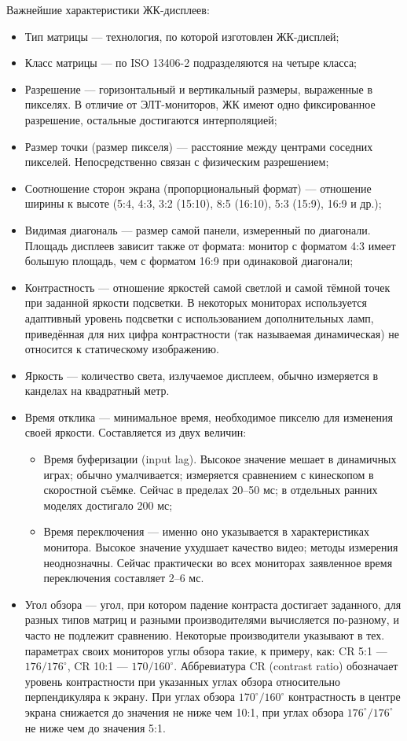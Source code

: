Важнейшие характеристики ЖК-дисплеев:
\begin{itemize}
\item Тип матрицы --- технология, по которой изготовлен ЖК-дисплей;
 \item Класс матрицы --- по ISO 13406-2 подразделяются на четыре класса;
 \item Разрешение --- горизонтальный и вертикальный размеры, выраженные в пикселях.
  В отличие от ЭЛТ-мониторов, ЖК имеют одно фиксированное разрешение, остальные достигаются интерполяцией;
 \item Размер точки (размер пикселя) --- расстояние между центрами соседних пикселей.
  Непосредственно связан с физическим разрешением;
 \item Соотношение сторон экрана (пропорциональный формат) --- отношение ширины к высоте (5:4, 4:3, 3:2 (15:10), 8:5 (16:10), 5:3 (15:9), 16:9 и др.);
 \item Видимая диагональ --- размер самой панели, измеренный по диагонали.
  Площадь дисплеев зависит также от формата: монитор с форматом 4:3 имеет большую площадь, чем с форматом 16:9 при одинаковой диагонали;
 \item Контрастность --- отношение яркостей самой светлой и самой тёмной точек при заданной яркости подсветки.
  В некоторых мониторах используется адаптивный уровень подсветки с использованием дополнительных ламп, приведённая для них цифра контрастности (так называемая динамическая) не относится к статическому изображению.
 \item Яркость --- количество света, излучаемое дисплеем, обычно измеряется в канделах на квадратный метр.
 \item Время отклика --- минимальное время, необходимое пикселю для изменения своей яркости.
  Составляется из двух величин: 
  \begin{itemize} 
   \item Время буферизации (input lag).
    Высокое значение мешает в динамичных играх; обычно умалчивается; измеряется сравнением с кинескопом в скоростной съёмке.
    Сейчас в пределах 20--50 мс; в отдельных ранних моделях достигало 200 мс;
   \item Время переключения --- именно оно указывается в характеристиках монитора.
    Высокое значение ухудшает качество видео; методы измерения неоднозначны.
    Сейчас практически во всех мониторах заявленное время переключения составляет 2--6 мс.
  \end{itemize}
 \item Угол обзора --- угол, при котором падение контраста достигает заданного, для разных типов матриц и разными производителями вычисляется по-разному, и часто не подлежит сравнению.
  Некоторые производители указывают в тех. параметрах своих мониторов углы обзора такие, к примеру, как: CR 5:1 --- $176/176^{\circ}$, CR 10:1 --- $170/160^{\circ}$.
  Аббревиатура CR (contrast ratio) обозначает уровень контрастности при указанных углах обзора относительно перпендикуляра к экрану.
  При углах обзора $170^{\circ}/160^{\circ}$ контрастность в центре экрана снижается до значения не ниже чем 10:1, при углах обзора $176^{\circ}/176^{\circ}$ не ниже чем до значения 5:1.
\end{itemize}

